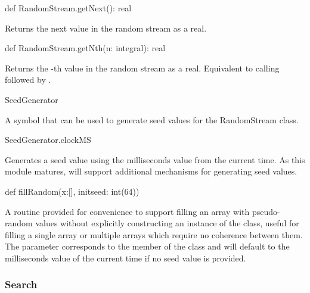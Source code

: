 \begin{protohead}
def RandomStream.getNext(): real
\end{protohead}
\begin{protobody}
Returns the next value in the random stream as a real.
\end{protobody}

\begin{protohead}
def RandomStream.getNth(n: integral): real
\end{protohead}
\begin{protobody}
Returns the -th value in the random stream as a real.  Equivalent to
calling  followed by .
\end{protobody}

\begin{protohead}
SeedGenerator
\end{protohead}
\begin{protobody}
A symbol that can be used to generate seed values for the RandomStream
class.
\end{protobody}

\begin{protohead}
SeedGenerator.clockMS
\end{protohead}
\begin{protobody}
Generates a seed value using the milliseconds value from the current
time.  As this module matures,  will support
additional mechanisms for generating seed values.
\end{protobody}

\begin{protohead}
def fillRandom(x:[], initseed: int(64))
\end{protohead}
\begin{protobody}

A routine provided for convenience to support filling an array
 with pseudo-random values without explicitly constructing an
instance of the  class, useful for filling a single
array or multiple arrays which require no coherence between them.  The
 parameter corresponds to the  member of the
 class and will default to the milliseconds value
of the current time if no seed value is provided.
\end{protobody}


\subsubsection{Search}
\label{Search}

